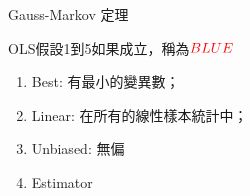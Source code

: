 \documentclass[xcolor=dvipsnames]{beamer}
\begin{document}
\begin{frame}{Gauss-Markov 定理}
\begin{theorem}
OLS假設1到5如果成立，稱為$\textcolor{red}{BLUE} $
\begin{enumerate}
\item Best: 有最小的變異數；
\item Linear: 在所有的線性樣本統計中；
\item Unbiased: 無偏
\item Estimator
\end{enumerate}
\end{theorem}
\end{frame}
\end{document}
